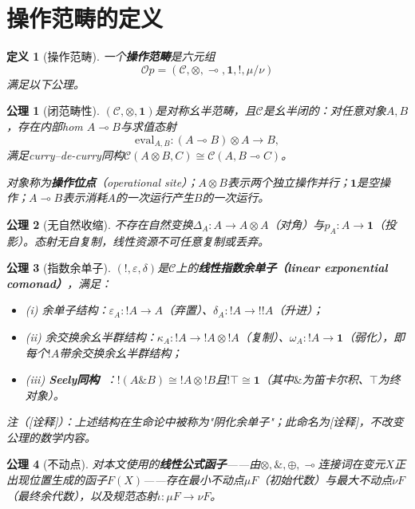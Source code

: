 \documentclass[11pt,a4paper]{article}
\newtheorem{axiom}{公理}
\newtheorem{definition}{定义}
\newcommand{\cat}[1]{\mathcal{#1}}
\newcommand{\Op}{\cat{O}\!p}
\newcommand{\C}{\cat{C}}
\newcommand{\I}{\mathbf{1}}
\newcommand{\lolli}{\multimap}
\newcommand{\bang}{{!}}
\newcommand{\tensor}{\otimes}
\newcommand{\eval}{\mathrm{eval}}
\newcommand{\eps}{\varepsilon}
\newcommand{\mU}{\mu}
\newcommand{\mN}{\nu}
\begin{document}
\section{操作范畴的定义}

\begin{definition}[操作范畴]\label{def:opcat}
一个\textbf{操作范畴}是六元组
$$\Op = (\C, \tensor, \lolli, \I, \bang, \mU/\mN)$$
满足以下公理。
\end{definition}

\begin{axiom}[闭范畴性]\label{ax:linear}
$(\C, \tensor, \I)$是对称幺半范畴，且$\C$是幺半闭的：对任意对象$A,B$，存在内部hom $A\lolli B$与求值态射
$$\eval_{A,B} : (A\lolli B)\tensor A \to B,$$
满足curry--de-curry同构$\C(A\tensor B,C)\cong\C(A,B\lolli C)$。

对象称为\textbf{操作位点}（operational site）；$A\tensor B$表示两个独立操作并行；$\I$是空操作；$A\lolli B$表示消耗$A$的一次运行产生$B$的一次运行。
\end{axiom}

\begin{axiom}[无自然收缩]\label{ax:no-contraction}
不存在自然变换$\Delta_A : A \to A\tensor A$（对角）与$p_A : A \to \I$（投影）。态射无自复制，线性资源不可任意复制或丢弃。
\end{axiom}

\begin{axiom}[指数余单子]\label{ax:bang}
$(\bang, \eps, \delta)$是$\C$上的\textbf{线性指数余单子（linear exponential comonad）}，满足：
\begin{itemize}
  \item (i) 余单子结构：$\eps_A : \bang A \to A$（弃置）、$\delta_A : \bang A \to \bang\bang A$（升进）；
  \item (ii) 余交换余幺半群结构：$\kappa_A : \bang A \to \bang A\tensor\bang A$（复制）、$\omega_A : \bang A \to \I$（弱化），即每个$\bang A$带余交换余幺半群结构；
  \item (iii) \textbf{Seely同构~\cite{seely89}}：$\bang(A\&B)\cong\bang A\tensor\bang B$且$\bang\top\cong\I$（其中$\&$为笛卡尔积、$\top$为终对象）。
\end{itemize}
注（[诠释]）：上述结构在生命论中被称为"阴化余单子"；此命名为[诠释]，不改变公理的数学内容。
\end{axiom}

\begin{axiom}[不动点]\label{ax:fixedpoints}
对本文使用的\textbf{线性公式函子}——由$\tensor,\&,\oplus,\lolli$连接词在变元$X$正出现位置生成的函子$F(X)$——存在最小不动点$\mU F$（初始代数）与最大不动点$\mN F$（最终余代数），以及规范态射$\iota:\mU F\to\mN F$。
\end{axiom}
\end{document}
